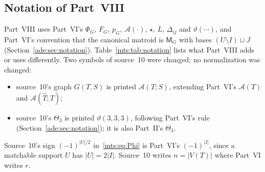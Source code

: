 \documentclass[11pt]{article}
\numberwithin{equation}{section}
\theoremstyle{definition}
\newcommand{\calA}{\mathcal A}
\newcommand{\del}{\Delta}
\begin{document}
\subsection{Notation of Part~VIII}
\label{mts:sec:notation}
Part~VIII uses Part~VI's $\Phi_G$, $F_G$, $p_G$, $\calA(\cdot)$, $\star$,
$L$, $\del_{ij}$ and $\vartheta(\cdots)$, and Part~VI's convention that the
canonical matroid is $\mathsf M_G$ with bases $(U\setminus I)\sqcup J$
(Section~\ref{ade:sec:notation}). Table~\ref{mts:tab:notation} lists what
Part~VIII adds or uses differently. Two symbols of source~10 were changed;
no normalization was changed:
\begin{itemize}[leftmargin=1.4em]
\item source~10's graph $G(T,S)$ is printed $\calA(T;S)$, extending
Part~VI's $\calA(T)$ and $\calA(\widehat T;T)$;
\item source~10's $\Theta_3$ is printed $\vartheta(3,3,3)$, following
Part~VI's rule (Section~\ref{ade:sec:notation}); it is also Part~II's
$\Theta_3$.
\end{itemize}
Source~10's sign $(-1)^{|U|/2}$ in~\eqref{mts:eq:Phi} is Part~VI's
$(-1)^{|I|}$, since a matchable support $U$ has $|U|=2|I|$. Source~10 writes
$n=|V(T)|$ where Part~VI writes $r$.
\end{document}
